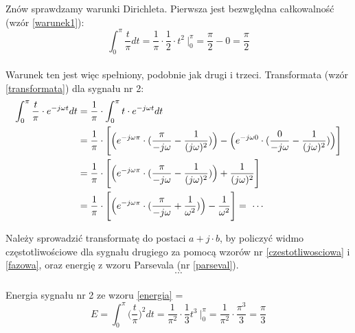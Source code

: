 \documentclass[11pt,a4paper]{article}
\newcounter{liczba1}
\newcounter{liczba2}
\numberwithin{liczba1}{liczba2}
\begin{document}
\setcounter{liczba1}{2}
\setcounter{equation}{1}

Znów sprawdzamy warunki Dirichleta. Pierwsza jest bezwględna całkowalność (wzór \ref{warunek1}):
\begin{equation}
\int_{0}^{\pi} \frac{t}{\pi} dt = \frac{1}{\pi} \cdot \frac{1}{2} \cdot t^2 \ \Bigg|^\pi_0 = \frac{\pi}{2} - 0 = \frac{\pi}{2}
\end{equation} \\

Warunek ten jest więc spełniony, podobnie jak drugi i trzeci. Transformata (wzór \ref{transformata}) dla sygnału nr 2:
\begin{equation}
\begin{split}
\int_{0}^{\pi} \frac{t}{\pi} \cdot e^{-j \omega t} dt
&{} = \frac{1}{\pi} \cdot \int_{0}^{\pi} t \cdot e^{-j \omega t} dt \\
&{} = \frac{1}{\pi} \cdot \Bigg[\Big(e^{-j \omega \pi} \cdot (\frac{\pi}{-j \omega} - \frac{1}{(\-j \omega)^2})\Big) - \Big(e^{-j \omega 0} \cdot (\frac{0}{-j \omega} - \frac{1}{(\-j \omega)^2})\Big)\Bigg] \\
&{} = \frac{1}{\pi} \cdot \Bigg[\Big(e^{-j \omega \pi} \cdot (\frac{\pi}{-j \omega} - \frac{1}{(\-j \omega)^2})\Big) + \frac{1}{(\-j \omega)^2}\Bigg] \\
&{} = \frac{1}{\pi} \cdot \Bigg[\Big(e^{-j \omega \pi} \cdot (\frac{\pi}{-j \omega} + \frac{1}{\omega^2})\Big) - \frac{1}{\omega^2}\Bigg] = \ \cdots
\end{split}
\end{equation}

Należy sprowadzić transformatę do postaci $ a + j \cdot b $, by policzyć widmo częstotliwościowe dla sygnału drugiego za pomocą wzorów nr \ref{czestotliwosciowa} i \ref{fazowa}, oraz energię z wzoru Parsevala (nr \ref{parseval}). \\

\begin{equation}
\cdots
\end{equation} \\

Energia sygnału nr 2 ze wzoru \ref{energia} = 
\begin{equation}
E = \int_{0}^{\pi} \Big(\frac{t}{\pi}\Big)^2 dt = \frac{1}{\pi^2} \cdot \frac{1}{3} t^3 \ \Bigg|_{0}^{\pi} = \frac{1}{\pi^2} \cdot \frac{\pi^3}{3} = \frac{\pi}{3}
\end{equation} \\
\end{document}
